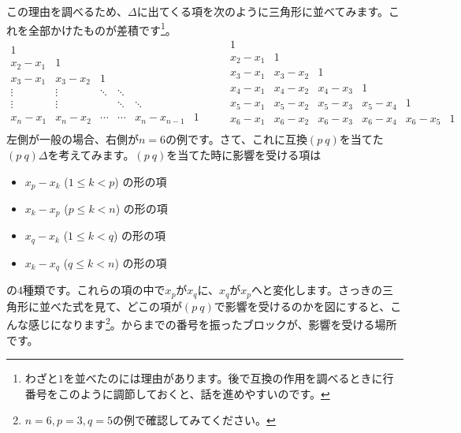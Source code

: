 この理由を調べるため、$\Delta$に出てくる項を次のように三角形に並べてみます。これを全部かけたものが差積です\footnote{わざと$1$を並べたのには理由があります。後で互換の作用を調べるときに行番号をこのように調節しておくと、話を進めやすいのです。}。
\[
\begin{array}{cccccc}
1 & \\
x_2 - x_1 & 1 \\
x_3 - x_1 & x_3 - x_2 & 1 \\
\vdots & \vdots & \ddots & \ddots \\
\vdots & \vdots & & \ddots & \ddots \\
x_n - x_1 & x_n - x_2 & \cdots & \cdots &  x_n - x_{n - 1} & 1
\end{array} \qquad
\begin{array}{cccccc} %
1 & \\
x_2 - x_1 & 1 \\
x_3 - x_1 & x_3 - x_2 & 1 \\
x_4 - x_1 & x_4 - x_2 & x_4 - x_3 & 1 \\
x_5 - x_1 & x_5 - x_2 & x_5 - x_3 & x_5 - x_4 & 1 \\
x_6 - x_1 & x_6 - x_2 & x_6 - x_3 & x_6 - x_4 & x_6 - x_5 & 1 \\
\end{array}
\]
左側が一般の場合、右側が$n = 6$の例です。さて、これに互換$(p\ q)$を当てた$(p\ q)\Delta$を考えてみます。$(p\ q)$を当てた時に影響を受ける項は\begin{itemize}
\item $x_p - x_k$ ($1 \leq k < p$) の形の項
\item $x_k - x_p$ ($p \leq k < n$) の形の項
\item $x_q - x_k$ ($1 \leq k < q$) の形の項
\item $x_k - x_q$ ($q \leq k < n$) の形の項
\end{itemize}
の$4$種類です。これらの項の中で$x_p$が$x_q$に、$x_q$が$x_p$へと変化します。さっきの三角形に並べた式を見て、どこの項が$(p\ q)$で影響を受けるのかを図にすると、こんな感じになります\footnote{$n = 6, p = 3, q = 5$の例で確認してみてください。}。からまでの番号を振ったブロックが、影響を受ける場所です。
